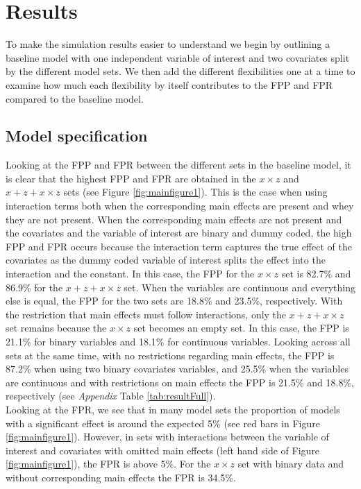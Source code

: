 \section{Results} 
To make the simulation results easier to understand we begin by outlining a baseline model with one independent  variable of interest and two covariates split by the different model sets. We then add the different flexibilities one at a time to examine how much each flexibility by itself contributes to the FPP and FPR compared to the baseline model. 

\subsection{Model specification}
Looking at the FPP and FPR between the different sets in the baseline model, it is clear that the highest FPP and FPR are obtained in the $x \times z$ and $x + z+ x \times z$ sets (see Figure \ref{fig:mainfigure1}). This is the case when using interaction terms both when the corresponding main effects are present and whey they are not present. When the corresponding main effects are not present and the covariates and the variable of interest are binary and dummy coded, the high FPP and FPR occurs because the interaction term  captures the true effect of the covariates as the dummy coded variable of interest splits the effect into the interaction and the constant. In this case, the FPP for the $x \times z$ set is 82.7\% and 86.9\% for the $x + z+ x \times z$ set. When the variables are continuous and everything else is equal, the FPP for the two sets are 18.8\% and 23.5\%, respectively. With the restriction that main effects must follow interactions, only the $x + z+ x \times z$ set remains because the $x \times z$ set becomes an empty set. In this case, the FPP is 21.1\% for binary variables and 18.1\% for continuous variables. Looking across all sets at the same time, with no restrictions regarding main effects, the FPP is 87.2\% when using two binary covariates variables, and 25.5\% when the variables are continuous and with restrictions on main effects the FPP is 21.5\% and 18.8\%, respectively (see \textit{Appendix} Table \ref{tab:resultFull}). \\ 
Looking at the FPR, we see that in many model sets the proportion of models with a significant effect is around the expected 5\%  (see red bars in Figure \ref{fig:mainfigure1}). However, in sets with interactions between the variable of interest and covariates with omitted main effects (left hand side of Figure \ref{fig:mainfigure1}), the FPR is above 5\%. For the $x \times z$ set with binary data and without corresponding main effects the FPR is 34.5\%.
 \\

